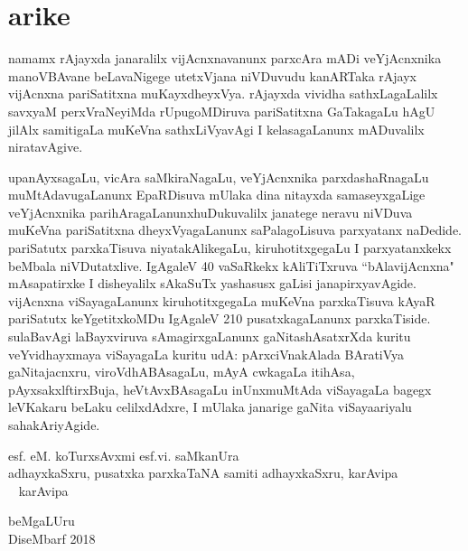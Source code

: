 \chapter*{arike}

namamx rAjayxda janaralilx vijAcnxnavanunx parxcAra mADi veYjAcnxnika manoVBAvane beLavaNi\-gege utetxVjana niVDuvudu kanARTaka rAjayx vijAcnxna pariSatitxna muKayxdheyxVya. rAjayxda vividha sathxLagaLalilx savxyaM perxVraNeyiMda rUpugoMDiruva pariSatitxna GaTakagaLu hAgU jilAlx samitigaLa muKeVna sathxLiVyavAgi I kelasagaLanunx mADuvalilx niratavAgive.

upanAyxsagaLu, vicAra saMkiraNagaLu, veYjAcnxnika parxdashaRnagaLu muMtAdavu\break gaLanunx EpaRDisuva mUlaka dina nitayxda samaseyxgaLige veYjAcnxnika parihAragaLanunx\break huDukuvalilx janatege neravu niVDuva muKeVna pariSatitxna dheyxVyagaLanunx saPalagoLisuva parxyatanx naDedide. pariSatutx parxkaTisuva niyatakAlikegaLu, kiruhotitxgegaLu I parxyatanxkekx\- beMbala niVDutatxlive. IgAgaleV {\rm 40} vaSaRkekx kAliTiTxruva ``bAlavijAcnxna" mAsa\-patirxke I disheyalilx sAkaSuTx yashasusx gaLisi janapirxyavAgide. vijAcnxna viSayagaLanunx kiru\-hotitxgegaLa muKeVna parxkaTisuva kAyaR pariSatutx keYgetitxkoMDu IgAgaleV {\rm 210} pusatxka\-gaLanunx parxkaTiside. sulaBavAgi laBayxviruva sAmagirxgaLanunx gaNitashAsatxrXda kuritu veYvidhayx\-maya viSayagaLa kuritu udA: pArxciVnakAlada BAratiVya gaNitajacnxru, viroVdhA\-BAsagaLu, mAyA cwkagaLa itihAsa, pAyxsakxlftirxBuja, heVtAvxBAsagaLu inUnx\break  muMtAda viSayagaLa bagegx leVKakaru beLaku celilxdAdxre, I mUlaka janarige gaNita viSayaariyalu sahakAriyAgide.


\bigskip
\medskip

\noindent
\quad 
esf. eM. koTurxsAvxmi \hfill  esf.vi. saMkanUra\\
adhayxkaSxru, pusatxka parxkaTaNA samiti \hfill adhayxkaSxru, karAvipa\\
~\phantom{AAAAA~} karAvipa

\bigskip

\noindent
beMgaLUru\\
DiseMbarf {\rm  2018}
